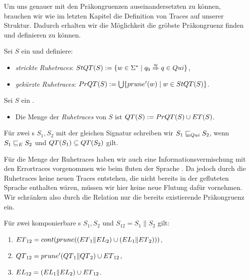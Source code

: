 Um uns genauer mit den Präkongruenzen auseinandersetzten zu können, brauchen
wir wie im letzten Kapitel die Definition von Traces auf unserer Struktur.
Dadurch erhalten wir die Möglichkeit die gröbste Präkongruenz finden und
definieren zu können.

\begin{Def}[Ruhetraces]
  \label{DefRuhetraces}
  Sei $S$ ein \EIO{} und definiere:
  \begin{itemize}
    \item \emph{strickte Ruhetraces}: $StQT{}(S) := \{w\in\Sigma ^*\mid q_0
      \overset{w}{\Rightarrow} q\in Qui\}$,
    \item \emph{gekürzte Ruhetraces}: $PrQT{}(S) := \bigcup\{prune'(w)\mid
      w\in StQT{}(S)\}$.
  \end{itemize}
\end{Def}

\begin{Def}
  \label{DefQTQL}
  Sei $S$ ein \EIO{}.
  \begin{itemize}
    \item Die Menge der \emph{Ruhetraces} von $S$ ist $QT{}(S) :=
      PrQT{}(S)\cup ET{}(S)$.
  \end{itemize}
  Für zwei \EIO{}s $S_1, S_2$ mit der gleichen Signatur schreiben wir
  $S_1\sqsubseteq _{Qui} S_2$, wenn $S_1\sqsubseteq _E S_2$ und $QT{}(S_1)\subseteq QT{}(S_2)$ gilt.
\end{Def}

Für die Menge der Ruhetraces \QT{} haben wir auch eine Informationsvermischung
mit den Errortraces vorgenommen wie beim fluten der Sprache \EL{}. Da jedoch
durch die Ruhetraces keine neuen Traces entstehen, die nicht bereits in der
gefluteten Sprache \EL{} enthalten wären, müssen wir hier keine neue Flutung
dafür vornehmen. Wir schränken also durch die Relation \QRel{} nur die
bereits existierende Präkongruenz \ERel{} ein.

\begin{satz}
  \label{satzQuiSemantik}
  Für zwei komponierbare \EIO{}s $S_1, S_2$ und $S_{12} = S_1\|S_2$ gilt:
  \begin{enumerate}
    \item $ET{}_{12} = cont{}(prune{}((ET{}_1\|EL{}_2)\cup (EL{}_1\|ET{}_2)))$,
    \item $QT{}_{12} = prune'(QT{}_1\|QT{}_2)\cup ET{}_{12}$,
    \item $EL{}_{12} = (EL{}_1\|EL{}_2)\cup ET{}_{12}$.
  \end{enumerate}
\end{satz}


